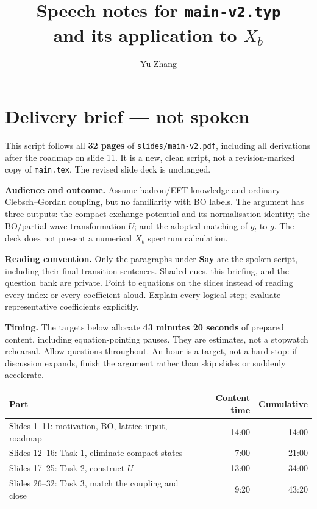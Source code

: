 \documentclass[11pt,a4paper]{article}
\title{Speech notes for \texttt{main-v2.typ}\\[0.4em]
  \large \BOchiEFT{} and its application to $X_b$}
\author{Yu Zhang}
\date{}
\begin{document}
\maketitle
{}

\section*{Delivery brief --- not spoken}
This script follows all \textbf{32 pages} of \texttt{slides/main-v2.pdf}, including
all derivations after the roadmap on slide 11. It is a new, clean script, not a
revision-marked copy of \texttt{main.tex}. The revised slide deck is unchanged.

\textbf{Audience and outcome.} Assume hadron/EFT knowledge and ordinary
Clebsch--Gordan coupling, but no familiarity with BO labels. The argument has
three outputs: the compact-exchange potential and its normalisation identity;
the BO/partial-wave transformation $U$; and the adopted matching of $g_l$ to $g$.
The deck does not present a numerical $X_b$ spectrum calculation.

\textbf{Reading convention.} Only the paragraphs under \textbf{Say} are the
spoken script, including their final transition sentences. Shaded cues,
this briefing, and the question bank are private. Point to equations on the
slides instead of reading every index or every coefficient aloud. Explain
every logical step; evaluate representative coefficients explicitly.

\textbf{Timing.} The targets below allocate \textbf{43 minutes 20 seconds} of
prepared content, including equation-pointing pauses. They are estimates,
not a stopwatch rehearsal. Allow questions throughout. An hour is a target,
not a hard stop: if discussion expands, finish the argument rather than skip
slides or suddenly accelerate.

\begin{center}
\begin{tabular}{@{}>{\raggedright\arraybackslash}p{8.3cm}rr@{}}
\toprule
Part & Content time & Cumulative\\
\midrule
Slides 1--11: motivation, BO, lattice input, roadmap & 14:00 & 14:00\\
Slides 12--16: Task 1, eliminate compact states & 7:00 & 21:00\\
Slides 17--25: Task 2, construct $U$ & 13:00 & 34:00\\
Slides 26--32: Task 3, match the coupling and close & 9:20 & 43:20\\
\bottomrule
\end{tabular}
\end{center}
\end{document}
